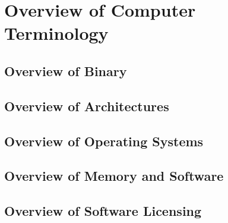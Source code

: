 \chapter{Overview of Computer Terminology}
\localtableofcontents
\clearpage

\section{Overview of Binary}

\linebreak

\section{Overview of Architectures}

\linebreak

\section{Overview of Operating Systems}

\linebreak

\section{Overview of Memory and Software}

\linebreak

\section{Overview of Software Licensing}

\linebreak